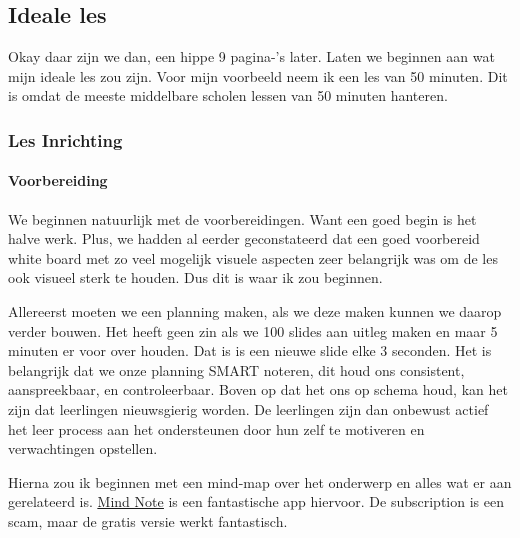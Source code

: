         \subsection{Ideale les}
            Okay daar zijn we dan, een hippe 9 pagina-'s later. Laten we beginnen aan wat mijn ideale les zou zijn. Voor mijn voorbeeld neem ik een les van 50 minuten. Dit is omdat de meeste middelbare scholen lessen van 50 minuten hanteren. 
            
            \subsubsection{Les Inrichting}
                \paragraph{Voorbereiding}
                    We beginnen natuurlijk met de voorbereidingen. Want een goed begin is het halve werk. Plus, we hadden al eerder geconstateerd dat een goed voorbereid white board met zo veel mogelijk visuele aspecten zeer belangrijk was om de les ook visueel sterk te houden. Dus dit is waar ik zou beginnen. 

                    \bigskip

                    \noindent Allereerst moeten we een planning maken, als we deze maken kunnen we daarop verder bouwen. Het heeft geen zin als we 100 slides aan uitleg maken en maar 5 minuten er voor over houden. Dat is is een nieuwe slide elke 3 seconden. Het is belangrijk dat we onze planning SMART noteren, dit houd ons consistent, aanspreekbaar, en controleerbaar. Boven op dat het ons op schema houd, kan het zijn dat leerlingen nieuwsgierig worden. De leerlingen zijn dan onbewust actief het leer process aan het ondersteunen door hun zelf te motiveren en verwachtingen opstellen.\cite{NAME-ME}
                    
                    \bigskip

                    \noindent Hierna zou ik beginnen met een mind-map over het onderwerp en alles wat er aan gerelateerd is. \hyperlink{https://www.mindnode.com}{\underline{Mind Note}} is een fantastische app hiervoor. De subscription is een scam, maar de gratis versie werkt fantastisch. 
                    
                    \bigskip

